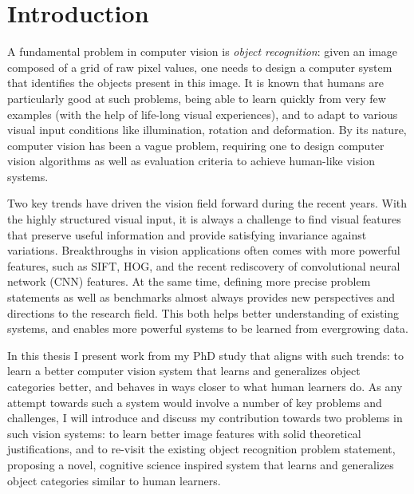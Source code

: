 \chapter{Introduction}

A fundamental problem in computer vision is \emph{object recognition}: given an image composed of a grid of raw pixel values, one needs to design a computer system that identifies the objects present in this image. It is known that humans are particularly good at such problems, being able to learn quickly from very few examples (with the help of life-long visual experiences), and to adapt to various visual input conditions like illumination, rotation and deformation. By its nature, computer vision has been a vague problem, requiring one to design computer vision algorithms as well as evaluation criteria to achieve human-like vision systems.

Two key trends have driven the vision field forward during the recent years. With the highly structured visual input, it is always a challenge to find visual features that preserve useful information and provide satisfying invariance against variations. Breakthroughs in vision applications often comes with more powerful features, such as SIFT, HOG, and the recent rediscovery of convolutional neural network (CNN) features. At the same time, defining more precise problem statements as well as benchmarks almost always provides new perspectives and directions to the research field. This both helps better understanding of existing systems, and enables more powerful systems to be learned from evergrowing data.

In this thesis I present work from my PhD study that aligns with such trends: to learn a better computer vision system that learns and generalizes object categories better, and behaves in ways closer to what human learners do. As any attempt towards such a system would involve a number of key problems and challenges, I will introduce and discuss my contribution towards two problems in such vision systems: to learn better image features with solid theoretical justifications, and to re-visit the existing object recognition problem statement, proposing a novel, cognitive science inspired system that learns and generalizes object categories similar to human learners. 

